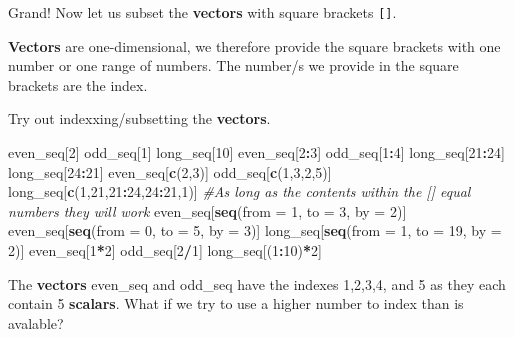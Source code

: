 \documentclass[]{book}
\newenvironment{Shaded}{\begin{snugshade}}{\end{snugshade}}
\newcommand{\KeywordTok}[1]{\textcolor[rgb]{0.13,0.29,0.53}{\textbf{#1}}}
\newcommand{\DataTypeTok}[1]{\textcolor[rgb]{0.13,0.29,0.53}{#1}}
\newcommand{\DecValTok}[1]{\textcolor[rgb]{0.00,0.00,0.81}{#1}}
\newcommand{\CommentTok}[1]{\textcolor[rgb]{0.56,0.35,0.01}{\textit{#1}}}
\newcommand{\OperatorTok}[1]{\textcolor[rgb]{0.81,0.36,0.00}{\textbf{#1}}}
\newcommand{\NormalTok}[1]{#1}
\begin{document}
Grand! Now let us subset the \textbf{vectors} with square brackets
\texttt{{[}{]}}.

\textbf{Vectors} are one-dimensional, we therefore provide the square
brackets with one number or one range of numbers. The number/s we
provide in the square brackets are the index.

Try out indexxing/subsetting the \textbf{vectors}.

\begin{Shaded}
\begin{Highlighting}[]
\NormalTok{even_seq[}\DecValTok{2}\NormalTok{]}
\NormalTok{odd_seq[}\DecValTok{1}\NormalTok{]}
\NormalTok{long_seq[}\DecValTok{10}\NormalTok{]}
\NormalTok{even_seq[}\DecValTok{2}\OperatorTok{:}\DecValTok{3}\NormalTok{]}
\NormalTok{odd_seq[}\DecValTok{1}\OperatorTok{:}\DecValTok{4}\NormalTok{]}
\NormalTok{long_seq[}\DecValTok{21}\OperatorTok{:}\DecValTok{24}\NormalTok{]}
\NormalTok{long_seq[}\DecValTok{24}\OperatorTok{:}\DecValTok{21}\NormalTok{]}
\NormalTok{even_seq[}\KeywordTok{c}\NormalTok{(}\DecValTok{2}\NormalTok{,}\DecValTok{3}\NormalTok{)]}
\NormalTok{odd_seq[}\KeywordTok{c}\NormalTok{(}\DecValTok{1}\NormalTok{,}\DecValTok{3}\NormalTok{,}\DecValTok{2}\NormalTok{,}\DecValTok{5}\NormalTok{)]}
\NormalTok{long_seq[}\KeywordTok{c}\NormalTok{(}\DecValTok{1}\NormalTok{,}\DecValTok{21}\NormalTok{,}\DecValTok{21}\OperatorTok{:}\DecValTok{24}\NormalTok{,}\DecValTok{24}\OperatorTok{:}\DecValTok{21}\NormalTok{,}\DecValTok{1}\NormalTok{)]}
\CommentTok{#As long as the contents within the [] equal numbers they will work}
\NormalTok{even_seq[}\KeywordTok{seq}\NormalTok{(}\DataTypeTok{from =} \DecValTok{1}\NormalTok{, }\DataTypeTok{to =} \DecValTok{3}\NormalTok{, }\DataTypeTok{by =} \DecValTok{2}\NormalTok{)]}
\NormalTok{even_seq[}\KeywordTok{seq}\NormalTok{(}\DataTypeTok{from =} \DecValTok{0}\NormalTok{, }\DataTypeTok{to =} \DecValTok{5}\NormalTok{, }\DataTypeTok{by =} \DecValTok{3}\NormalTok{)]}
\NormalTok{long_seq[}\KeywordTok{seq}\NormalTok{(}\DataTypeTok{from =} \DecValTok{1}\NormalTok{, }\DataTypeTok{to =} \DecValTok{19}\NormalTok{, }\DataTypeTok{by =} \DecValTok{2}\NormalTok{)]}
\NormalTok{even_seq[}\DecValTok{1}\OperatorTok{*}\DecValTok{2}\NormalTok{]}
\NormalTok{odd_seq[}\DecValTok{2}\OperatorTok{/}\DecValTok{1}\NormalTok{]}
\NormalTok{long_seq[(}\DecValTok{1}\OperatorTok{:}\DecValTok{10}\NormalTok{)}\OperatorTok{*}\DecValTok{2}\NormalTok{]}
\end{Highlighting}
\end{Shaded}

The \textbf{vectors} even\_seq and odd\_seq have the indexes 1,2,3,4,
and 5 as they each contain 5 \textbf{scalars}. What if we try to use a
higher number to index than is avalable?
\end{document}
